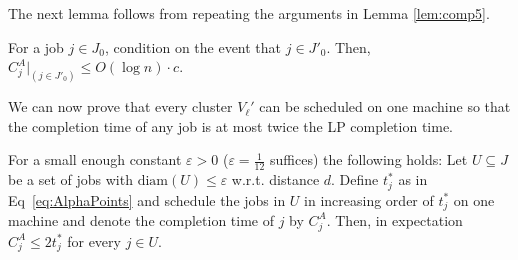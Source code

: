 The next lemma follows from repeating the arguments in Lemma \ref{lem:comp5}. 
\begin{lemma}
\label{l:ctsecondbatch2}
For a job $j \in J_0$, condition on the event that $j \in J'_0$.  Then, $C^A_j|_{(j \in J'_0)} \leq O(\log n ) \cdot c$.
\end{lemma}

We can now prove that every cluster $V_{\ell}'$ can be scheduled on one machine so that the completion time
of any job is at most twice the LP completion time.
\begin{lemma} \label{l:ctsecondbatch}
  For a small enough constant $\varepsilon > 0$ ($\varepsilon = \frac{1}{12}$ suffices) the following holds: 
  Let $U \subseteq J$ be a set of jobs 
  with $\textrm{diam}(U) \leq \varepsilon$ w.r.t. distance $d$. Define $t_j^*$ as in Eq~\eqref{eq:AlphaPoints} and
  schedule the jobs in $U$ in increasing order of $t_j^*$ on one machine and denote the completion time of $j$ by $C_j^A$.
  Then, in expectation $C_j^A \leq 2 t_j^*$ for every $j \in U$.
\end{lemma}


